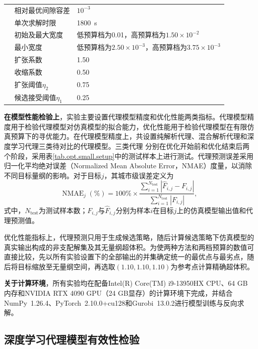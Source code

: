 {\begin{longtable}{L{2.0cm}L{7.7cm}L{3.0cm}}
\addlinespace[2pt]
& 相对最优间隙容差 & $10^{-3}$ \\*
& 单次求解时限 & 1800~s \\
\addlinespace[2pt]
& 初始及最大宽度 & 低预算档为0.01，高预算档为$1.50\times10^{-2}$ \\*
& 最小宽度 & 低预算档为$2.50\times10^{-3}$，高预算档为$3.75\times10^{-3}$ \\*
& 扩张系数 & 1.50 \\*
& 收缩系数 & 0.50 \\*
& 扩张阈值$\eta_2$ & 0.75 \\*
& 候选接受阈值$\eta_1$ & 0.25 \\
\end{longtable}
}

\textbf{在模型性能检验上}，实验主要设置代理模型精度和优化性能两类指标。代理模型精度用于检验代理模型对仿真模型的拟合能力，优化性能用于检验代理模型在有限仿真预算下的寻优能力。在代理模型精度上，共设置纯解析代理、混合解析代理和深度学习代理三类待对比的代理模型。三类代理
分别在优化开始前和优化结束后两个阶段，采用表\ref{tab.opt.small.setup}中的测试样本上进行测试。代理预测误差采用归一化平均绝对误差（Normalized Mean Absolute Error，NMAE）度量，以消除不同目标量纲的影响。对于目标$j$，其城市级误差定义为
\begin{equation}
\operatorname{NMAE}_{j}(\%)
=100\%\times
\frac{\displaystyle\sum_{i=1}^{N_{\mathrm{test}}}
\left|\hat F_{i,j}-F_{i,j}\right|}
{\displaystyle\sum_{i=1}^{N_{\mathrm{test}}}
\left|F_{i,j}\right|},
\label{eq.opt.small.nmae}
\end{equation}
式中，$N_{\mathrm{test}}$为测试样本数；$F_{i,j}$与$\hat F_{i,j}$分别为样本$i$在目标$j$上的仿真模型输出值和代理预测值。

优化性能指标上，代理预测只用于生成候选策略，随后计算候选策略下仿真模型的真实输出构成的非支配解集及其无量纲超体积。为使两种方法和两档预算的数值可直接比较，先以所有实验设置下的全部输出的并集确定统一的最优点与最劣点，随后将目标缩放至无量纲空间，再选取$(1.10,1.10,1.10)$为参考点计算精确超体积。

\textbf{关于计算环境}，所有实验均在配备Intel(R) Core(TM) i9-13950HX CPU、64 GB内存和NVIDIA RTX 4090 GPU（24 GB显存）的计算环境下完成，并结合NumPy~1.26.4、PyTorch~2.10.0+cu128和Gurobi~13.0.2进行模型训练与反向求解。

\subsection{深度学习代理模型有效性检验}\label{subsec.opt.small.mip}


